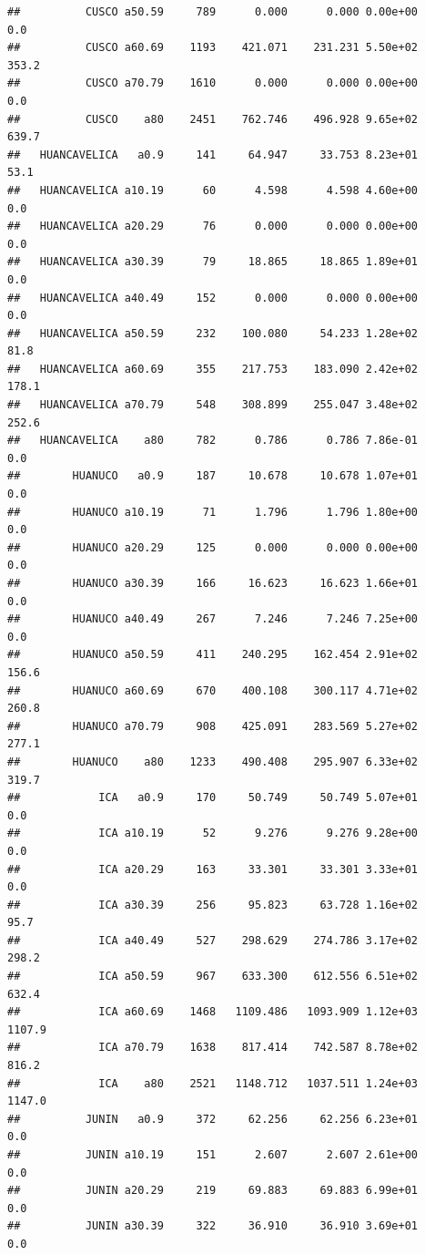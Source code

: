 \documentclass[
]{article}
\begin{document}
\begin{verbatim}
##          CUSCO a50.59     789      0.000      0.000 0.00e+00        0.0
##          CUSCO a60.69    1193    421.071    231.231 5.50e+02      353.2
##          CUSCO a70.79    1610      0.000      0.000 0.00e+00        0.0
##          CUSCO    a80    2451    762.746    496.928 9.65e+02      639.7
##   HUANCAVELICA   a0.9     141     64.947     33.753 8.23e+01       53.1
##   HUANCAVELICA a10.19      60      4.598      4.598 4.60e+00        0.0
##   HUANCAVELICA a20.29      76      0.000      0.000 0.00e+00        0.0
##   HUANCAVELICA a30.39      79     18.865     18.865 1.89e+01        0.0
##   HUANCAVELICA a40.49     152      0.000      0.000 0.00e+00        0.0
##   HUANCAVELICA a50.59     232    100.080     54.233 1.28e+02       81.8
##   HUANCAVELICA a60.69     355    217.753    183.090 2.42e+02      178.1
##   HUANCAVELICA a70.79     548    308.899    255.047 3.48e+02      252.6
##   HUANCAVELICA    a80     782      0.786      0.786 7.86e-01        0.0
##        HUANUCO   a0.9     187     10.678     10.678 1.07e+01        0.0
##        HUANUCO a10.19      71      1.796      1.796 1.80e+00        0.0
##        HUANUCO a20.29     125      0.000      0.000 0.00e+00        0.0
##        HUANUCO a30.39     166     16.623     16.623 1.66e+01        0.0
##        HUANUCO a40.49     267      7.246      7.246 7.25e+00        0.0
##        HUANUCO a50.59     411    240.295    162.454 2.91e+02      156.6
##        HUANUCO a60.69     670    400.108    300.117 4.71e+02      260.8
##        HUANUCO a70.79     908    425.091    283.569 5.27e+02      277.1
##        HUANUCO    a80    1233    490.408    295.907 6.33e+02      319.7
##            ICA   a0.9     170     50.749     50.749 5.07e+01        0.0
##            ICA a10.19      52      9.276      9.276 9.28e+00        0.0
##            ICA a20.29     163     33.301     33.301 3.33e+01        0.0
##            ICA a30.39     256     95.823     63.728 1.16e+02       95.7
##            ICA a40.49     527    298.629    274.786 3.17e+02      298.2
##            ICA a50.59     967    633.300    612.556 6.51e+02      632.4
##            ICA a60.69    1468   1109.486   1093.909 1.12e+03     1107.9
##            ICA a70.79    1638    817.414    742.587 8.78e+02      816.2
##            ICA    a80    2521   1148.712   1037.511 1.24e+03     1147.0
##          JUNIN   a0.9     372     62.256     62.256 6.23e+01        0.0
##          JUNIN a10.19     151      2.607      2.607 2.61e+00        0.0
##          JUNIN a20.29     219     69.883     69.883 6.99e+01        0.0
##          JUNIN a30.39     322     36.910     36.910 3.69e+01        0.0

\end{verbatim}
\end{document}
